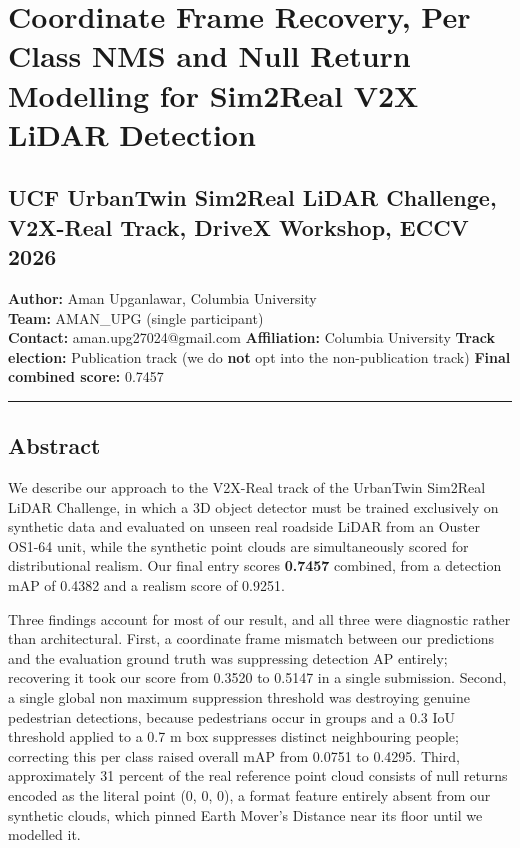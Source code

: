 \documentclass[
  10pt,
]{article}
\author{}
\date{}
\begin{document}
\section{Coordinate Frame Recovery, Per Class NMS and Null Return
Modelling for Sim2Real V2X LiDAR
Detection}\label{coordinate-frame-recovery-per-class-nms-and-null-return-modelling-for-sim2real-v2x-lidar-detection}

\subsection{UCF UrbanTwin Sim2Real LiDAR Challenge, V2X-Real Track,
DriveX Workshop, ECCV
2026}\label{ucf-urbantwin-sim2real-lidar-challenge-v2x-real-track-drivex-workshop-eccv-2026}

\textbf{Author:} Aman Upganlawar, Columbia University\\
\textbf{Team:} AMAN\_UPG (single participant)\\
\textbf{Contact:} aman.upg27024@gmail.com \textbf{Affiliation:} Columbia
University \textbf{Track election:} Publication track (we do
\textbf{not} opt into the non-publication track) \textbf{Final combined
score:} 0.7457

\begin{center}\rule{0.5\linewidth}{0.5pt}\end{center}

\subsection{Abstract}\label{abstract}

We describe our approach to the V2X-Real track of the UrbanTwin Sim2Real
LiDAR Challenge, in which a 3D object detector must be trained
exclusively on synthetic data and evaluated on unseen real roadside
LiDAR from an Ouster OS1-64 unit, while the synthetic point clouds are
simultaneously scored for distributional realism. Our final entry scores
\textbf{0.7457} combined, from a detection mAP of 0.4382 and a realism
score of 0.9251.

Three findings account for most of our result, and all three were
diagnostic rather than architectural. First, a coordinate frame mismatch
between our predictions and the evaluation ground truth was suppressing
detection AP entirely; recovering it took our score from 0.3520 to
0.5147 in a single submission. Second, a single global non maximum
suppression threshold was destroying genuine pedestrian detections,
because pedestrians occur in groups and a 0.3 IoU threshold applied to a
0.7 m box suppresses distinct neighbouring people; correcting this per
class raised overall mAP from 0.0751 to 0.4295. Third, approximately 31
percent of the real reference point cloud consists of null returns
encoded as the literal point (0, 0, 0), a format feature entirely absent
from our synthetic clouds, which pinned Earth Mover's Distance near its
floor until we modelled it.
\end{document}
